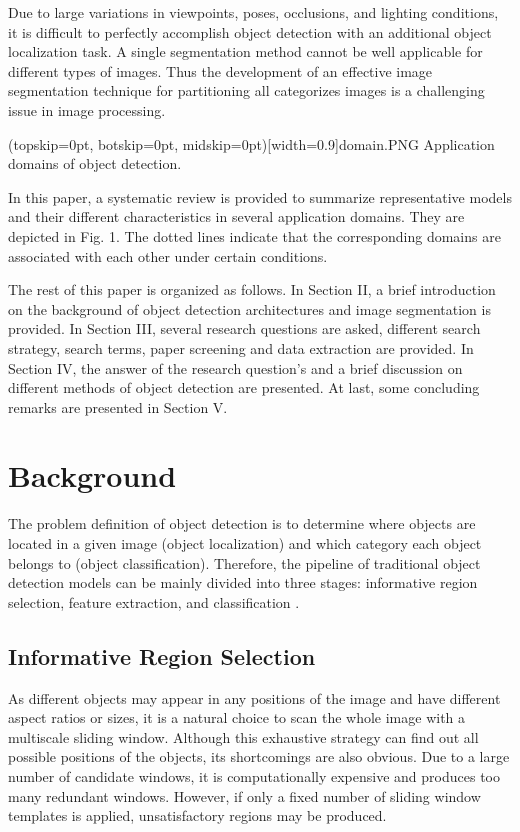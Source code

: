 \documentclass[two column]{ieeeaccess}
\begin{document}
Due to large variations in viewpoints, poses, occlusions, and lighting conditions, it is difficult to perfectly accomplish object detection with an additional object localization task. A single segmentation method cannot be well applicable for different types of images. Thus the development of an effective image segmentation technique for partitioning all categorizes images is a challenging issue in image processing.

\Figure[h](topskip=0pt, botskip=0pt, midskip=0pt)[width=0.9\linewidth]{domain.PNG} {Application domains of object detection. \label{fig1}}

In this paper, a systematic review is provided to summarize representative models and their different characteristics in several application domains. They are depicted in Fig. 1.  The dotted lines indicate that the corresponding domains are associated with each other under certain conditions. 

The rest of this paper is organized as follows. In Section II, a brief introduction on the background of object detection architectures and image segmentation is provided. In Section III, several research questions are asked, different search strategy, search terms, paper screening and data extraction are provided. In Section IV, the answer of the research question's and a brief discussion on different methods of object detection are presented. At last, some concluding remarks are presented in Section V.

\section{Background}

The problem definition of object detection is to determine where objects are located in a given image (object localization) and which category each object belongs to (object classification). Therefore, the pipeline of traditional object detection models can be mainly divided into three stages: informative region selection, feature extraction, and classification \cite{30}.

\subsection{Informative Region Selection}

As different objects may appear in any positions of the image and have different aspect ratios or sizes, it is a natural choice to scan the whole image with a multiscale sliding window. Although this exhaustive strategy can find out all possible positions of the objects, its shortcomings are also obvious. Due to a large number of candidate windows, it is computationally expensive and produces too many redundant windows. However, if only a fixed number of sliding window templates is applied, unsatisfactory regions may be produced.
\end{document}
